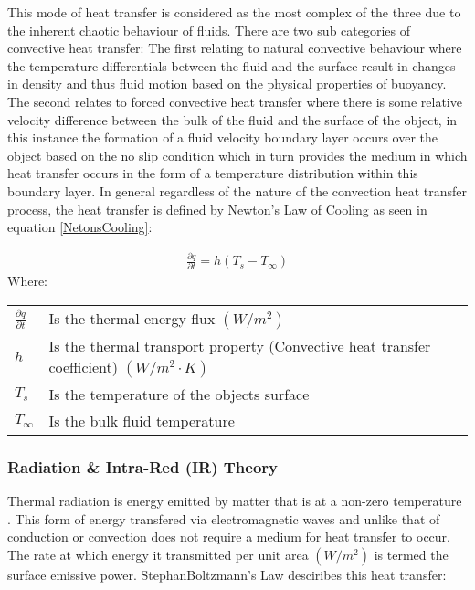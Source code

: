 \documentclass[12pt]{article}
\newcommand{\ts}{\textsuperscript}
\newcommand{\mycite}[1]{\ts{\cite{#1}}}
\begin{document}
This mode of heat transfer is considered as the most complex of the three due to the inherent chaotic behaviour of fluids. There are two sub categories of convective heat transfer: The first relating to natural convective behaviour where the temperature differentials between the fluid and the surface result in changes in density and thus fluid motion based on the physical properties of buoyancy. The second relates to forced convective heat transfer where there is some relative velocity difference between the bulk of the fluid and the surface of the object, in this instance the formation of a fluid velocity boundary layer occurs over the object based on the no slip condition which in turn provides the medium in which heat transfer occurs in the form of a temperature distribution within this boundary layer. In general regardless of the nature of the convection heat transfer process, the heat transfer is defined by Newton's Law of Cooling as seen in equation \ref{NetonsCooling}: 

\begin{align} \label{NetonsCooling}
	\frac{\partial q}{\partial t} = h(T_s - T_\infty) 
\end{align}
Where: \\ 
\begin{tabular}{l | l}
	$\frac{\partial q}{\partial t}$ & Is the thermal energy flux $(W/m^2)$ \\ 
	$h$ & Is the thermal transport property (Convective heat transfer coefficient) $(W/m^2 \cdot K)$ \\ 
	$T_s$ & Is the temperature of the objects surface \\ 
	$T_\infty$ & Is the bulk fluid temperature \\   
\end{tabular}


\subsubsection{Radiation \& Intra-Red (IR) Theory}

Thermal radiation is energy emitted by matter that is at a non-zero temperature \mycite{bergman2011fundamentals}. This form of energy transfered via electromagnetic waves and unlike that of conduction or convection does not require a medium for heat transfer to occur. The rate at which energy it transmitted per unit area $(W/m^2)$ is termed the surface emissive power. StephanBoltzmann's Law desciribes this heat transfer: 
 
\end{document}
